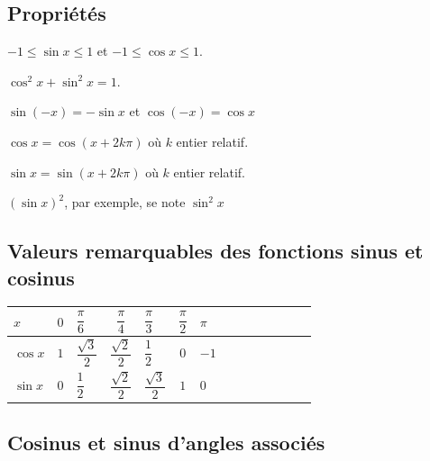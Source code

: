     \subsection{Propriétés}
        \begin{bprops}
            \begin{itemProp}
                \item $-1\leqslant \sin x \leqslant 1$ et $-1\leqslant \cos x \leqslant 1$.
                \item $\cos^2 x + \sin^2 x = 1$.
                \item $\sin(-x)=-\sin x$ et $\cos(-x)=\cos x$
                \item $\cos x= \cos(x+2k\pi)$ où $k$ entier relatif.
                \item $\sin x= \sin(x+2k\pi)$ où $k$ entier relatif.
            \end{itemProp}
        \end{bprops}
        
        \begin{brmq}
            $(\sin x)^2$, par exemple, se note $\sin^2 x$
        \end{brmq}
        
    \subsection{Valeurs remarquables des fonctions sinus et cosinus}
    
        \begin{center}
            \begin{tabular}{ | Xc | Xc | Xc | Xc | Xc | Xc | Xc |}
                 \hline			
                   \rowcolor{NavyBlue!55!white}$x$  & $0$ & $\dfrac{\pi}{6}$ & $\dfrac{\pi}{4}$ & $\dfrac{\pi}{3}$ & $\dfrac{\pi}{2}$ & $\pi$ \\ \hline
                   \rowcolor{NavyBlue!25!white}$\cos x$ & $1$ & $\dfrac{\sqrt 3}{2}$ & $\dfrac{\sqrt 2}{2}$ & $\dfrac{1}{2}$ & $0$ & $-1$ \\ \hline
                   \rowcolor{NavyBlue!25!white}$\sin x$ & $0$ & $\dfrac{1}{2}$ & $\dfrac{\sqrt 2}{2}$ & $\dfrac{\sqrt 3}{2}$ & $1$ & $0$ \\
                 \hline  
            \end{tabular}
        \end{center}
    
    \subsection{Cosinus et sinus d'angles associés}
    
